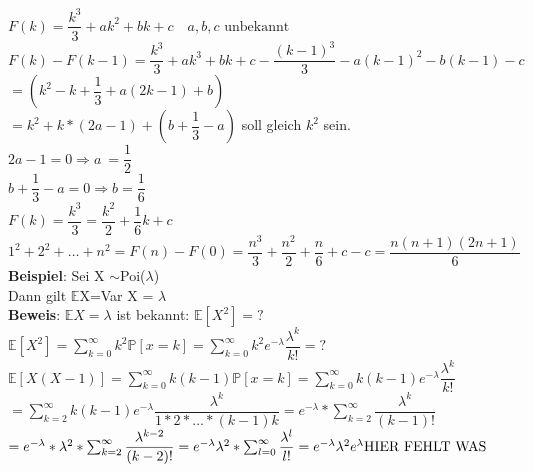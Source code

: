 $F(k) = \dfrac{k^3}{3}+ak^2+bk+c \quad a,b,c \text{ unbekannt}$\smallskip\\
$F(k)-F(k-1) = \dfrac{k^3}{3}+ak^3+bk+c-\dfrac{(k-1)^3}{3}-a(k-1)^2-b(k-1)-c$\smallskip\\
$=(k^2-k+\dfrac{1}{3}+a(2k-1)+b)$\smallskip\\
$=k^2+k*(2a-1)+(b+\dfrac{1}{3}-a)$ soll gleich $k^2$ sein.\smallskip\\
$2a-1 = 0 \Rightarrow a\ = \dfrac{1}{2}$\smallskip\\
$b+\dfrac{1}{3}-a=0 \Rightarrow b = \dfrac{1}{6}$\smallskip\\
$F(k) = \dfrac{k^3}{3} = \dfrac{k^2}{2}+\dfrac{1}{6}k+c$\medskip\\
$1^2+2^2+\dots+n^2=F(n)-F(0)=\dfrac{n^3}{3}+\dfrac{n^2}{2}+\dfrac{n}{6}+c-c = \dfrac{n(n+1)(2n+1)}{6}$\medskip\\
\textbf{Beispiel}: Sei X $\sim$Poi($\lambda$)\\
Dann gilt $\mathds{E}$X=Var X = $\lambda$\medskip\\
\textbf{Beweis}: $\mathds{E}X=\lambda $ ist bekannt: \hspace{1cm} $\mathds{E}[X^2]=?$\smallskip\\
$\mathds{E}[X^2]=\sum_{k=0}^\infty k^2\mathds{P}[x=k]=\sum_{k=0}^\infty k^2e^{-\lambda} \dfrac{\lambda^k}{k!}=? $\medskip\\
$\mathds{E}[X(X-1)] = \sum_{k=0}^\infty k(k-1)\mathds{P}[x=k] = \sum_{k=0}^\infty k(k-1)e^{-\lambda} \dfrac{\lambda^k}{k!}$\medskip\\
$=\sum_{k=2}^\infty k(k-1)e^{-\lambda}\dfrac{\lambda^k}{1*2*\dots*(k-1)k}=e^{-\lambda}* \sum_{k=2}^\infty\dfrac{\lambda^k}{(k-1)!}$\smallskip\\
\begin{math}
=e^{-\lambda}*\lambda^2*\sum_{k=2}^\infty \dfrac{\lambda^{k-2}}{(k-2)!}\smallskip\\
=e^{-\lambda} \lambda^2 * \sum_{l=0}^{\infty}\dfrac{\lambda^l}{l!}=e^{-\lambda}\lambda^2e^\lambda \medskip\\
\text{HIER FEHLT WAS}
\end{math}